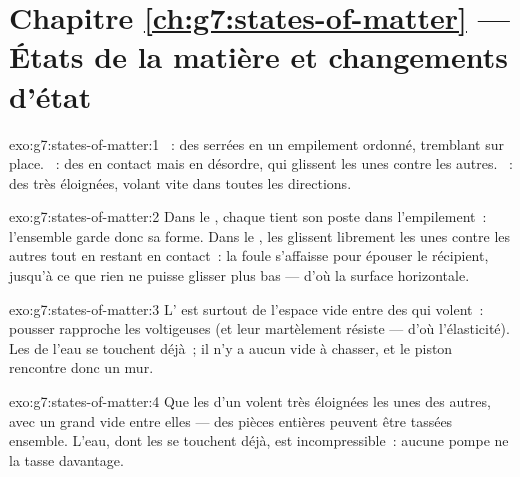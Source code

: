 \section*{Chapitre \ref{ch:g7:states-of-matter} --- États de la matière et changements d'état}

\begin{solution}{exo:g7:states-of-matter:1}
~: des  serrées en un empilement ordonné, tremblant
sur place. ~: des  en contact mais en désordre, qui
glissent les unes contre les autres. ~: des  très
éloignées, volant vite dans toutes les directions.
\end{solution}

\begin{solution}{exo:g7:states-of-matter:2}
Dans le , chaque  tient son poste dans l'empilement~:
l'ensemble garde donc sa forme. Dans le , les 
glissent librement les unes contre les autres tout en restant en
contact~: la foule s'affaisse pour épouser le récipient, jusqu'à ce
que rien ne puisse glisser plus bas --- d'où la surface horizontale.
\end{solution}

\begin{solution}{exo:g7:states-of-matter:3}
L' est surtout de l'espace vide entre des  qui volent~:
pousser rapproche les voltigeuses (et leur martèlement résiste ---
d'où l'élasticité). Les  de l'eau se touchent déjà~; il n'y
a aucun vide à chasser, et le piston rencontre donc un mur.
\end{solution}

\begin{solution}{exo:g7:states-of-matter:4}
Que les  d'un  volent très éloignées les unes des autres,
avec un grand vide entre elles --- des pièces entières peuvent être
tassées ensemble. L'eau, dont les  se touchent déjà, est
incompressible~: aucune pompe ne la tasse davantage.
\end{solution}

